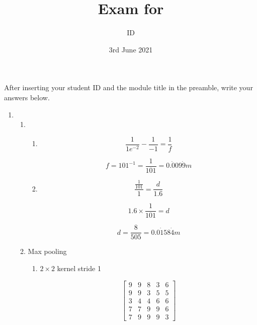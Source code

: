 \documentclass[12pt,a4paper]{article}
\author{ID \thestudentid}
\title{Exam for \theexam}
\date{3rd June 2021}
\begin{document}
\maketitle
After inserting your student ID and the module title in 
the preamble, write your answers below.

  \begin{enumerate}
          \item \begin{enumerate}
                  \item
                        \begin{enumerate}

                          \item
                        \[
                        \frac{1}{1e^{-2}} - \frac{1}{-1} = \frac{1}{f}
                        \]

                        \[
                        f = 101^{-1} = \frac{1}{101} = 0.\dot{0}09\dot{9}m
                                \]

                          \item
                                \[
                                \frac{\frac{1}{101}}{1} = \frac{d}{1.6}
                                \]

                                \[
                                1.6 \times \frac{1}{101} = d
                                \]

                                \[
                                d = \frac{8}{505}= 0.0\dot{1}58\dot{4} m
                                \]
                        \end{enumerate}

                  \item Max pooling
                        \begin{enumerate}
                          \item $2\times 2$ kernel stride 1

                                \[
                                \begin{bmatrix}
                                  9 & 9 & 8 & 3 & 6 \\
                                  9 & 9 & 3 & 5 & 5 \\
                                  3 & 4 & 4 & 6 & 6 \\
                                  7 & 7 & 9 & 9 & 6 \\
                                  7 & 9 & 9 & 9 & 3
                                \end{bmatrix}
                                \]



\end{enumerate}
\end{enumerate}
\end{enumerate}
\end{document}
